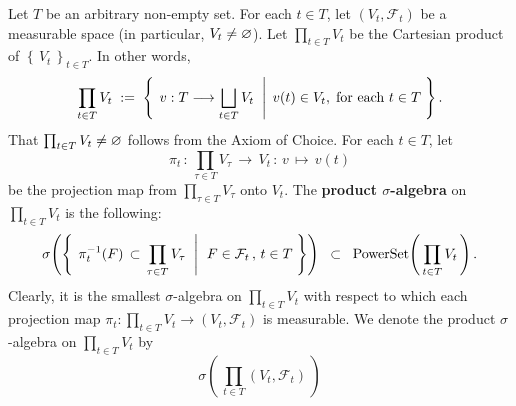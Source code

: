 \begin{definition}
\mbox{}\vskip 0.1cm
\noindent
Let $T$ be an arbitrary non-empty set.
For each $t \in T$, let $\left(V_{t},\mathcal{F}_{t}\right)$ be a measurable space
(in particular, $V_{t} \neq \varnothing$).
Let $\prod_{t \in T}V_{t}$ be the Cartesian product of $\left\{\,V_{t}\,\right\}_{t \in T}$.
In other words,
\begin{equation*}
\prod_{t \in T}V_{t}
\; := \;
\left\{\;
\left.
v : T \longrightarrow \bigsqcup_{t \in T}V_{t}
\;\;\right\vert\;
v(t) \in V_{t},
\;\textnormal{for each $t \in T$}
\;\right\}.
\end{equation*}
That $\prod_{t \in T}V_{t} \neq \varnothing$ follows from the Axiom of Choice.
For each $t \in T$, let
\begin{equation*}
\pi_{t} \,:\, \prod_{\tau \in T}V_{\tau} \,\longrightarrow\, V_{t} \,:\, v \, \longmapsto \, v(t)
\end{equation*}
be the projection map from $\prod_{\tau \in T}V_{\tau}$ onto $V_{t}$.
The \textbf{product $\sigma$-algebra} on $\prod_{t \in T}V_{t}$ is the following:
\begin{equation*}
\sigma\!\left(\left\{\;
\left.
\pi_{t}^{-1}\!\left(F\right) \,\subset\, \prod_{\tau \in T}V_{\tau}
\;\;\right\vert\;\,
F \in \mathcal{F}_{t} \,,\, t \in T
\;\right\}\right)
\;\; \subset \;\; \textnormal{PowerSet}\!\left(\,\prod_{t \in T}V_{t}\,\right).
\end{equation*}
Clearly, it is the smallest $\sigma$-algebra on $\prod_{t \in T}V_{t}$
with respect to which each projection map
$\pi_{t} : \prod_{t \in T}V_{t} \longrightarrow \left(V_{t},\mathcal{F}_{t}\right)$
is measurable.
We denote the product $\sigma$-algebra on $\prod_{t \in T}V_{t}$ by
\begin{equation*}
\sigma\!\left(\,\prod_{t \in T}(V_{t},\mathcal{F}_{t})\,\right)
\end{equation*}
\end{definition}

